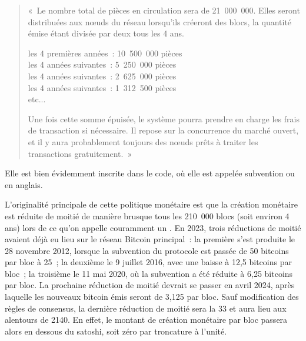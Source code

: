 \begin{quote}
«~Le nombre total de pièces en circulation sera de 21~000~000. Elles seront distribuées aux nœuds du réseau lorsqu'ils créeront des blocs, la quantité émise étant divisée par deux tous les 4 ans.

les 4 premières années~: 10~500~000 pièces\\
les 4 années suivantes~: 5~250~000 pièces\\
les 4 années suivantes~: 2~625~000 pièces\\
les 4 années suivantes~: 1~312~500 pièces\\
etc...

Une fois cette somme épuisée, le système pourra prendre en charge les frais de transaction si nécessaire. Il repose sur la concurrence du marché ouvert, et il y aura probablement toujours des nœuds prêts à traiter les transactions gratuitement.~»
\end{quote}

Elle est bien évidemment inscrite dans le code, où elle est appelée subvention ou  en anglais.

L'originalité principale de cette politique monétaire est que la création monétaire est réduite de moitié de manière brusque tous les 210~000 blocs (soit environ 4 ans) lors de ce qu'on appelle couramment un . En 2023, trois réductions de moitié avaient déjà eu lieu sur le réseau Bitcoin principal~: la première s'est produite le 28 novembre 2012, lorsque la subvention du protocole est passée de 50 bitcoins par bloc à 25~; la deuxième le 9 juillet 2016, avec une baisse à 12,5 bitcoins par bloc~; la troisième le 11 mai 2020, où la subvention a été réduite à 6,25 bitcoins par bloc. La prochaine réduction de moitié devrait se passer en avril 2024, après laquelle les nouveaux bitcoin émis seront de 3,125 par bloc. Sauf modification des règles de consensus, la dernière réduction de moitié sera la 33\ieme{} et aura lieu aux alentours de 2140. En effet, le montant de création monétaire par bloc passera alors en dessous du satoshi, soit zéro par troncature à l'unité.

%
% 
% 


